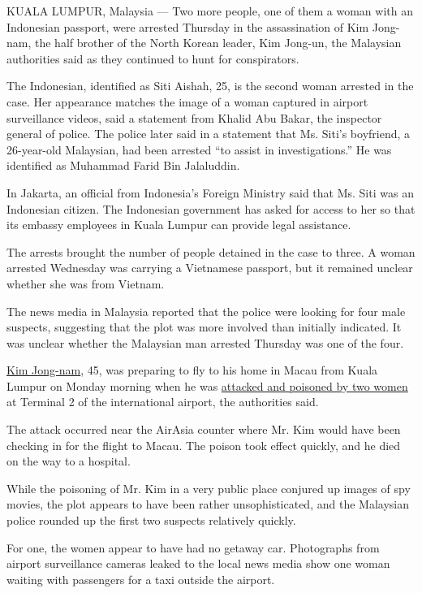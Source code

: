 KUALA LUMPUR, Malaysia --- Two more people, one of them a woman with an
Indonesian passport, were arrested Thursday in the assassination of Kim
Jong-nam, the half brother of the North Korean leader, Kim Jong-un, the
Malaysian authorities said as they continued to hunt for conspirators.

The Indonesian, identified as Siti Aishah, 25, is the second woman
arrested in the case. Her appearance matches the image of a woman
captured in airport surveillance videos, said a statement from Khalid
Abu Bakar, the inspector general of police. The police later said in a
statement that Ms. Siti's boyfriend, a 26-year-old Malaysian, had been
arrested ``to assist in investigations.'' He was identified as Muhammad
Farid Bin Jalaluddin.

In Jakarta, an official from Indonesia's Foreign Ministry said that Ms.
Siti was an Indonesian citizen. The Indonesian government has asked for
access to her so that its embassy employees in Kuala Lumpur can provide
legal assistance.

The arrests brought the number of people detained in the case to three.
A woman arrested Wednesday was carrying a Vietnamese passport, but it
remained unclear whether she was from Vietnam.

The news media in Malaysia reported that the police were looking for
four male suspects, suggesting that the plot was more involved than
initially indicated. It was unclear whether the Malaysian man arrested
Thursday was one of the four.

\href{https://www.nytimes3xbfgragh.onion/2017/02/15/world/asia/kim-jong-nam-assassination-north-korea.html}{Kim
Jong-nam}, 45, was preparing to fly to his home in Macau from Kuala
Lumpur on Monday morning when he was
\href{https://www.nytimes3xbfgragh.onion/2017/02/14/world/asia/kim-jong-un-brother-killed-malaysia.html}{attacked
and poisoned by two women} at Terminal 2 of the international airport,
the authorities said.

The attack occurred near the AirAsia counter where Mr. Kim would have
been checking in for the flight to Macau. The poison took effect
quickly, and he died on the way to a hospital.

While the poisoning of Mr. Kim in a very public place conjured up images
of spy movies, the plot appears to have been rather unsophisticated, and
the Malaysian police rounded up the first two suspects relatively
quickly.

For one, the women appear to have had no getaway car. Photographs from
airport surveillance cameras leaked to the local news media show one
woman waiting with passengers for a taxi outside the airport.

